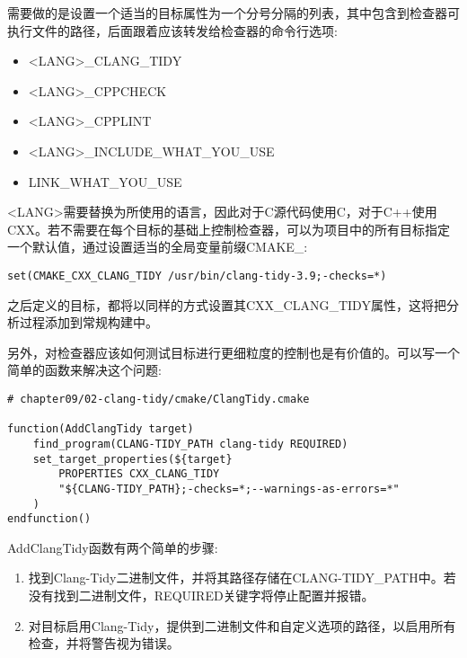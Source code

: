 需要做的是设置一个适当的目标属性为一个分号分隔的列表，其中包含到检查器可执行文件的路径，后面跟着应该转发给检查器的命令行选项:

\begin{itemize}
\item 
<LANG>\_CLANG\_TIDY

\item 
<LANG>\_CPPCHECK

\item 
<LANG>\_CPPLINT

\item 
<LANG>\_INCLUDE\_WHAT\_YOU\_USE

\item 
LINK\_WHAT\_YOU\_USE
\end{itemize}

<LANG>需要替换为所使用的语言，因此对于C源代码使用C，对于C++使用CXX。若不需要在每个目标的基础上控制检查器，可以为项目中的所有目标指定一个默认值，通过设置适当的全局变量前缀CMAKE\_:

\begin{lstlisting}[style=styleCMake]
set(CMAKE_CXX_CLANG_TIDY /usr/bin/clang-tidy-3.9;-checks=*)
\end{lstlisting}

之后定义的目标，都将以同样的方式设置其CXX\_CLANG\_TIDY属性，这将把分析过程添加到常规构建中。

另外，对检查器应该如何测试目标进行更细粒度的控制也是有价值的。可以写一个简单的函数来解决这个问题:

\begin{lstlisting}[style=styleCMake]
# chapter09/02-clang-tidy/cmake/ClangTidy.cmake

function(AddClangTidy target)
	find_program(CLANG-TIDY_PATH clang-tidy REQUIRED)
	set_target_properties(${target}
		PROPERTIES CXX_CLANG_TIDY
		"${CLANG-TIDY_PATH};-checks=*;--warnings-as-errors=*"
	)
endfunction()
\end{lstlisting}

AddClangTidy函数有两个简单的步骤:

\begin{enumerate}
\item 
找到Clang-Tidy二进制文件，并将其路径存储在CLANG-TIDY\_PATH中。若没有找到二进制文件，REQUIRED关键字将停止配置并报错。

\item 
对目标启用Clang-Tidy，提供到二进制文件和自定义选项的路径，以启用所有检查，并将警告视为错误。
\end{enumerate}

